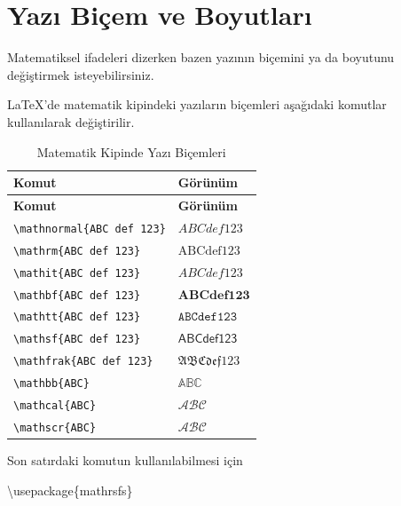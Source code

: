 \documentclass[
  10pt,
]{scrbook}
\newenvironment{Shaded}{\begin{snugshade}}{\end{snugshade}}
\newcommand{\BuiltInTok}[1]{#1}
\newcommand{\ExtensionTok}[1]{#1}
\newcommand{\NormalTok}[1]{#1}
\theoremstyle{definition}
\theoremstyle{definition}
\theoremstyle{definition}
\theoremstyle{definition}
\theoremstyle{remark}
\begin{document}
\hypertarget{yazux131-biuxe7em-ve-boyutlarux131}{%
\section{Yazı Biçem ve Boyutları}\label{yazux131-biuxe7em-ve-boyutlarux131}}

Matematiksel ifadeleri dizerken bazen yazının biçemini ya da boyutunu değiştirmek isteyebilirsiniz.

LaTeX'de matematik kipindeki yazıların biçemleri aşağıdaki komutlar kullanılarak değiştirilir.

\begin{longtable}[]{@{}ll@{}}
\caption{\label{tab:matyazi} Matematik Kipinde Yazı Biçemleri}\tabularnewline
\toprule
\textbf{Komut} & \textbf{Görünüm} \\
\midrule
\endfirsthead
\toprule
\textbf{Komut} & \textbf{Görünüm} \\
\midrule
\endhead
\texttt{\textbackslash{}mathnormal\{ABC\ def\ 123\}} & \(ABC def 123\) \\
\texttt{\textbackslash{}mathrm\{ABC\ def\ 123\}} & \(\mathrm{ABC def 123}\) \\
\texttt{\textbackslash{}mathit\{ABC\ def\ 123\}} & \(\mathit{ABC def 123}\) \\
\texttt{\textbackslash{}mathbf\{ABC\ def\ 123\}} & \(\mathbf{ABC def 123}\) \\
\texttt{\textbackslash{}mathtt\{ABC\ def\ 123\}} & \(\mathtt{ABC def 123}\) \\
\texttt{\textbackslash{}mathsf\{ABC\ def\ 123\}} & \(\mathsf{ABC def 123}\) \\
\texttt{\textbackslash{}mathfrak\{ABC\ def\ 123\}} & \(\mathfrak{ABC def 123}\) \\
\texttt{\textbackslash{}mathbb\{ABC\}} & \(\mathbb{ABC}\) \\
\texttt{\textbackslash{}mathcal\{ABC\}} & \(\mathcal{ABC}\) \\
\texttt{\textbackslash{}mathscr\{ABC\}} & \(\mathscr{ABC}\) \\
\bottomrule
\end{longtable}

Son satırdaki komutun kullanılabilmesi için

\begin{Shaded}
\begin{Highlighting}[]
\BuiltInTok{\textbackslash{}usepackage}\NormalTok{\{}\ExtensionTok{mathrsfs}\NormalTok{\}}
\end{Highlighting}
\end{Shaded}
\end{document}
